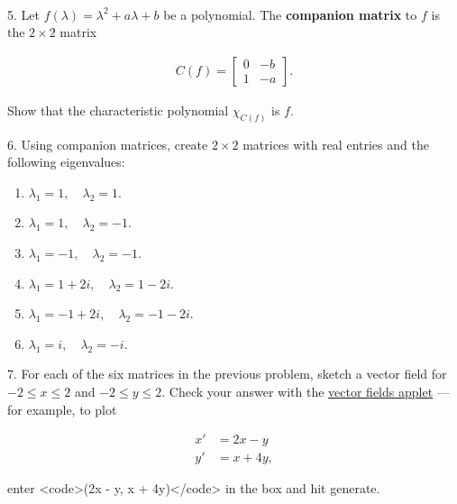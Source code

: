 \documentclass{article}
\begin{document}
~\\

5. Let $f(\lambda) = \lambda^2 + a\lambda + b$ be a polynomial. The \textbf{companion matrix} to $f$ is the $2 \times 2$ matrix

\begin{align*}
	C(f) = \left[\begin{array}{cc}0& -b \\ 1& -a\end{array}\right].
\end{align*}

Show that the characteristic polynomial $\chi_{C(f)}$ is $f$.

6. Using companion matrices, create $2 \times 2$ matrices with real entries and the following eigenvalues:

\begin{enumerate}

	\item $\lambda_1 = 1, \quad \lambda_2 = 1$.

	\item $\lambda_1 = 1, \quad \lambda_2 = -1$.

	\item $\lambda_1 = -1, \quad \lambda_2 = -1$.

	\item $\lambda_1 = 1 + 2i, \quad \lambda_2 = 1 - 2i$.

	\item $\lambda_1 = -1 + 2i, \quad \lambda_2 = -1 - 2i$.

	\item $\lambda_1 = i, \quad \lambda_2 = -i$.

\end{enumerate}

7. For each of the six matrices in the previous problem, sketch a vector field for $-2 \leq x \leq 2$ and $-2 \leq y \leq 2$. Check your answer with the \href{https://cruzgodar.com/applets/vector-fields}{vector fields applet} --- for example, to plot

\begin{align*}
	x' &= 2x - y\\
	y' &= x + 4y,
\end{align*}

enter <code>(2x - y, x + 4y)</code> in the box and hit generate.
\end{document}
